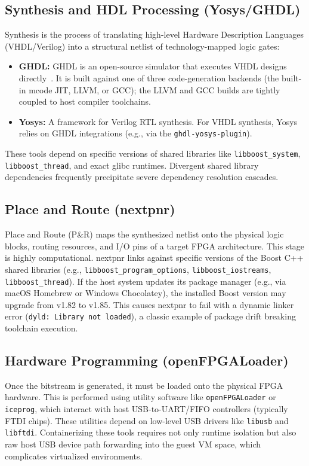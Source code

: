 \subsection{Synthesis and HDL Processing (Yosys/GHDL)}
Synthesis is the process of translating high-level Hardware Description Languages (VHDL\slash Verilog) into a structural netlist of technology-mapped logic gates:
\begin{itemize}
    \item \textbf{GHDL:} GHDL is an open-source simulator that executes VHDL designs directly~\cite{gingold2005ghdl}. It is built against one of three code-generation backends (the built-in mcode JIT, LLVM, or GCC); the LLVM and GCC builds are tightly coupled to host compiler toolchains.
    \item \textbf{Yosys:} A framework for Verilog RTL synthesis. For VHDL synthesis, Yosys relies on GHDL integrations (e.g., via the \texttt{ghdl-yosys-plugin}).
\end{itemize}
These tools depend on specific versions of shared libraries like \texttt{libboost\_system}, \texttt{libboost\_thread}, and exact glibc runtimes. Divergent shared library dependencies frequently precipitate severe dependency resolution cascades.

\subsection{Place and Route (nextpnr)}
Place and Route (P\&R) maps the synthesized netlist onto the physical logic blocks, routing resources, and I/O pins of a target FPGA architecture. This stage is highly computational. nextpnr links against specific versions of the Boost C++ shared libraries (e.g., \texttt{libboost\_program\_options}, \texttt{libboost\_iostreams}, \texttt{libboost\_thread}). If the host system updates its package manager (e.g., via macOS Homebrew or Windows Chocolatey), the installed Boost version may upgrade from v1.82 to v1.85. This causes nextpnr to fail with a dynamic linker error (\texttt{dyld: Library not loaded}), a classic example of package drift breaking toolchain execution.

\subsection{Hardware Programming (openFPGALoader)}
Once the bitstream is generated, it must be loaded onto the physical FPGA hardware. This is performed using utility software like \texttt{openFPGALoader} or \texttt{iceprog}, which interact with host USB-to-UART/FIFO controllers (typically FTDI chips). These utilities depend on low-level USB drivers like \texttt{libusb} and \texttt{libftdi}. Containerizing these tools requires not only runtime isolation but also raw host USB device path forwarding into the guest VM space, which complicates virtualized environments.

